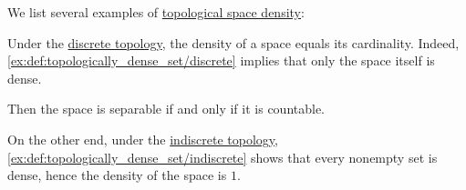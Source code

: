 \begin{example}\label{ex:def:topological_space_density}
  We list several examples of \hyperref[def:topological_space_density]{topological space density}:
  \begin{thmenum}
     Under the \hyperref[def:discrete_topology]{discrete topology}, the density of a space equals its cardinality. Indeed, \cref{ex:def:topologically_dense_set/discrete} implies that only the space itself is dense.

    Then the space is separable if and only if it is countable.

     On the other end, under the \hyperref[def:indiscrete_topology]{indiscrete topology}, \cref{ex:def:topologically_dense_set/indiscrete} shows that every nonempty set is dense, hence the density of the space is \( 1 \).
  \end{thmenum}
\end{example}


